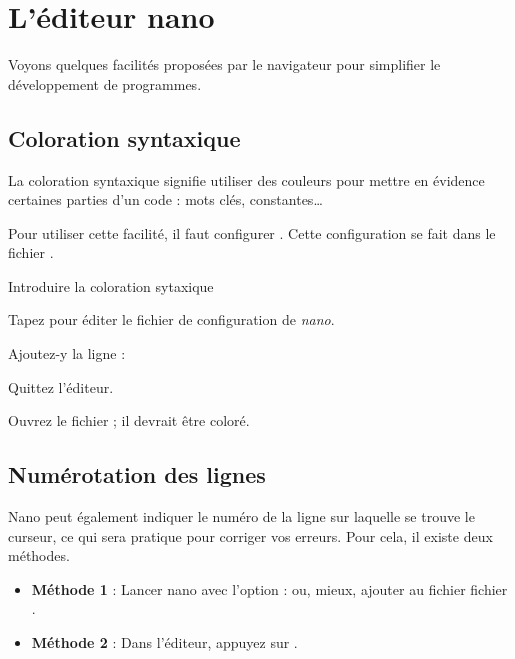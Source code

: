 \documentclass[a4paper,11pt]{style-esi/td}
\begin{document}
\newpage
\section{L'éditeur nano}

	Voyons quelques facilités proposées par le navigateur 
	pour simplifier le développement de programmes.

	\subsection{Coloration syntaxique}

		La coloration syntaxique signifie 
		utiliser des couleurs pour mettre en évidence certaines parties d'un code :
		mots clés, constantes\dots{}
	
		Pour utiliser cette facilité, 
		il faut configurer . 
		Cette configuration se fait dans le fichier .

		\begin{Tutoriel}{Introduire la coloration sytaxique} 
			\vspace{-1em}
			\begin{steps}
			\item 
				Tapez  
				pour éditer le fichier de configuration de \emph{nano}.
			\item 
				Ajoutez-y la ligne : 
			\item 
				Quittez l'éditeur.
			\item 
				Ouvrez le fichier ;
				il devrait être coloré.
			\end{steps}
		\end{Tutoriel}
				
	\subsection{Numérotation des lignes}
				
		Nano peut également indiquer le numéro de la ligne sur laquelle se trouve 
		le curseur, 
		ce qui sera pratique pour corriger vos erreurs. 
		Pour cela, il existe deux méthodes.

		\begin{itemize}
		\item \textbf{Méthode 1} : 
			Lancer nano avec l'option  : 
			ou, mieux, ajouter  au fichier
			fichier .
		\item \textbf{Méthode 2} : 
			Dans l'éditeur, appuyez sur .
		\end{itemize}
		
\end{document}
